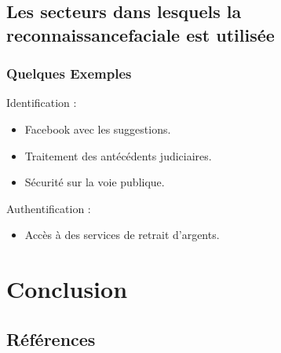 \documentclass{beamer}
\theoremstyle{plain}
\theoremstyle{definition}
\begin{document}
\subsection{Les secteurs dans lesquels la reconnaissancefaciale est utilisée}
\begin{frame}
  \frametitle{Quelques Exemples}
  Identification :
  \begin{itemize}
  \item <2-> Facebook avec les suggestions.
  \item <4-> Traitement des antécédents judiciaires.
  \item <5-> Sécurité sur la voie publique.
  \end{itemize}

  Authentification :
  \begin{itemize}
  \item <3-> Accès à des services de retrait d'argents.
  \end{itemize}  
\end{frame}

\section{Conclusion}
\begin{frame}
\end{frame}

\subsection{Références}
\begin{frame}  
\end{frame}
\end{document}
